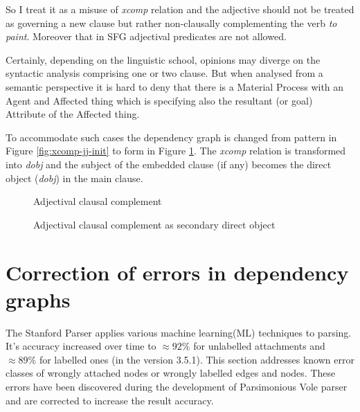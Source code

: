 So I treat it as a misuse of \textit{xcomp} relation and the adjective should not be treated as governing a new clause but rather non-clausally complementing the verb \textit{to paint}. Moreover that in SFG adjectival predicates are not allowed.

Certainly, depending on the linguistic school, opinions may diverge on the syntactic analysis comprising one or two clause. But when analysed from a semantic perspective it is hard to deny that there is a Material Process with an Agent and Affected thing which is specifying also the resultant (or goal) Attribute of the Affected thing. 

To accommodate such cases the dependency graph is changed from pattern in Figure \ref{fig:xcomp-jj-init} to form in Figure \ref{fig:xcomp-jj-final}. The \textit{xcomp} relation is transformed into \textit{dobj} and the subject of the embedded clause (if any) becomes the direct object (\textit{dobj}) in the main clause.

\begin{figure}[!ht]
	\begin{minipage}{0.45\linewidth}
		\centering
		\caption{Adjectival clausal complement}
		\label{fig:xcomp-jj-init}
	\end{minipage}
	\quad
	\begin{minipage}{0.45\linewidth}
		\centering
		\caption{Adjectival clausal complement as secondary direct object}
		\label{fig:xcomp-jj-final}
	\end{minipage}
\end{figure}

\section{Correction of errors in dependency graphs}
The Stanford Parser applies various machine learning(ML) techniques to parsing. It's accuracy increased over time to $\approx92\%$ for unlabelled attachments and $\approx89\%$ for labelled ones (in the version 3.5.1). This section addresses known error classes of wrongly attached nodes or wrongly labelled edges and nodes. These errors have been discovered during the development of Parsimonious Vole parser and are corrected to increase the result accuracy. 

